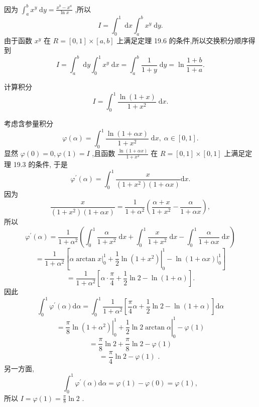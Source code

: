 \begin{solution}

\end{solution}
因为 \({\int }_{a}^{b}{x}^{y}\mathrm{\;d}y = \frac{{x}^{b} - {x}^{a}}{\ln x}\) ,所以
\[
I = {\int }_{0}^{1}\mathrm{\;d}x{\int }_{a}^{b}{x}^{y}\mathrm{\;d}y.
\]
由于函数 \({x}^{y}\) 在 \(R = \left\lbrack  {0,1}\right\rbrack   \times  \left\lbrack  {a,b}\right\rbrack\) 上满足定理 19.6 的条件,所以交换积分顺序得到
\[
I = {\int }_{a}^{b}\mathrm{\;d}y{\int }_{0}^{1}{x}^{y}\mathrm{\;d}x = {\int }_{a}^{b}\frac{1}{1 + y}\mathrm{\;d}y = \ln \frac{1 + b}{1 + a}.
\]
\begin{example}

\end{example}
计算积分
\[
I = {\int }_{0}^{1}\frac{\ln \left( {1 + x}\right) }{1 + {x}^{2}}\mathrm{\;d}x.
\]
\begin{solution}

\end{solution}
考虑含参量积分
\[
\varphi \left( \alpha \right)  = {\int }_{0}^{1}\frac{\ln \left( {1 + {\alpha x}}\right) }{1 + {x}^{2}}\mathrm{\;d}x,\;\alpha  \in  \left\lbrack  {0,1}\right\rbrack  .
\]
显然 \(\varphi \left( 0\right)  = 0,\varphi \left( 1\right)  = I\) ,且函数 \(\frac{\ln \left( {1 + {\alpha x}}\right) }{1 + {x}^{2}}\) 在 \(R = \left\lbrack  {0,1}\right\rbrack   \times  \left\lbrack  {0,1}\right\rbrack\) 上满足定理 19.3 的条件, 于是
\[
{\varphi }^{\prime }\left( \alpha \right)  = {\int }_{0}^{1}\frac{x}{\left( {1 + {x}^{2}}\right) \left( {1 + {\alpha x}}\right) }\mathrm{d}x.
\]
因为
\[
\frac{x}{\left( {1 + {x}^{2}}\right) \left( {1 + {\alpha x}}\right) } = \frac{1}{1 + {\alpha }^{2}}\left( {\frac{\alpha  + x}{1 + {x}^{2}} - \frac{\alpha }{1 + {\alpha x}}}\right) ,
\]
所以
\[
{\varphi }^{\prime }\left( \alpha \right)  = \frac{1}{1 + {\alpha }^{2}}\left( {{\int }_{0}^{1}\frac{\alpha }{1 + {x}^{2}}\mathrm{\;d}x + {\int }_{0}^{1}\frac{x}{1 + {x}^{2}}\mathrm{\;d}x - {\int }_{0}^{1}\frac{\alpha }{1 + {\alpha x}}\mathrm{\;d}x}\right)
\]
\[
= \frac{1}{1 + {\alpha }^{2}}\left\lbrack  {{\left. \alpha \arctan x\right| }_{0}^{1} + {\left. \frac{1}{2}\ln \left( 1 + {x}^{2}\right) \right| }_{0}^{1} - {\left. \ln \left( 1 + \alpha x\right) \right| }_{0}^{1}}\right\rbrack
\]
\[
= \frac{1}{1 + {\alpha }^{2}}\left\lbrack  {\alpha  \cdot  \frac{\pi }{4} + \frac{1}{2}\ln 2 - \ln \left( {1 + \alpha }\right) }\right\rbrack  .
\]
因此
\[
{\int }_{0}^{1}{\varphi }^{\prime }\left( \alpha \right) \mathrm{d}\alpha  = {\int }_{0}^{1}\frac{1}{1 + {\alpha }^{2}}\left\lbrack  {\frac{\pi }{4}\alpha  + \frac{1}{2}\ln 2 - \ln \left( {1 + \alpha }\right) }\right\rbrack  \mathrm{d}\alpha
\]
\[
= {\left. \frac{\pi }{8}\ln \left( 1 + {\alpha }^{2}\right) \right| }_{0}^{1} + {\left. \frac{1}{2}\ln 2\arctan \alpha \right| }_{0}^{1} - \varphi \left( 1\right)
\]
\[
= \frac{\pi }{8}\ln 2 + \frac{\pi }{8}\ln 2 - \varphi \left( 1\right)
\]
\[
= \frac{\pi }{4}\ln 2 - \varphi \left( 1\right) \text{ . }
\]
另一方面,
\[
{\int }_{0}^{1}{\varphi }^{\prime }\left( \alpha \right) \mathrm{d}\alpha  = \varphi \left( 1\right)  - \varphi \left( 0\right)  = \varphi \left( 1\right) ,
\]
所以 \(I = \varphi \left( 1\right)  = \frac{\pi }{8}\ln 2\) .

